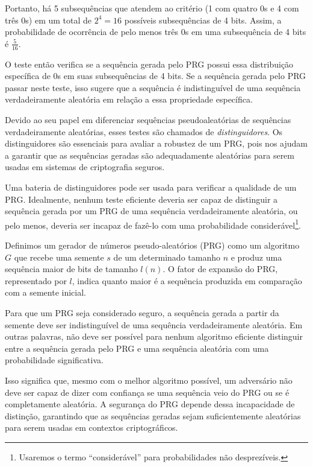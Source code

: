 Portanto, há 5 subsequências que atendem ao critério (1 com quatro $0$s e 4 com três $0$s) em um total de $2^4 = 16$ possíveis subsequências de 4 bits.
Assim, a probabilidade de ocorrência de pelo menos três $0$s em uma subsequência de 4 bits é $\frac{5}{16}$.

O teste então verifica se a sequência gerada pelo PRG possui essa distribuição específica de $0$s em suas subsequências de 4 bits.
Se a sequência gerada pelo PRG passar neste teste, isso sugere que a sequência é indistinguível de uma sequência verdadeiramente aleatória em relação a essa propriedade específica.

Devido ao seu papel em diferenciar sequências pseudoaleatórias de sequências verdadeiramente aleatórias, esses testes são chamados de {\em distinguidores}.
Os distinguidores são essenciais para avaliar a robustez de um PRG, pois nos ajudam a garantir que as sequências geradas são adequadamente aleatórias para serem usadas em sistemas de criptografia seguros.

Uma bateria de distinguidores pode ser usada para verificar a qualidade de um PRG.
Idealmente, nenhum teste eficiente deveria ser capaz de distinguir a sequência gerada por um PRG de uma sequência verdadeiramente aleatória, ou pelo menos, deveria ser incapaz de fazê-lo com uma probabilidade considerável\footnote{Usaremos o termo ``considerável'' para probabilidades não desprezíveis.}.

Definimos um gerador de números pseudo-aleatórios (PRG) como um algoritmo $G$ que recebe uma semente $s$ de um determinado tamanho $n$ e produz uma sequência maior de bits de tamanho $l(n)$.
O fator de expansão do PRG, representado por $l$, indica quanto maior é a sequência produzida em comparação com a semente inicial.

Para que um PRG seja considerado seguro, a sequência gerada a partir da semente deve ser indistinguível de uma sequência verdadeiramente aleatória.
Em outras palavras, não deve ser possível para nenhum algoritmo eficiente distinguir entre a sequência gerada pelo PRG e uma sequência aleatória com uma probabilidade significativa.

Isso significa que, mesmo com o melhor algoritmo possível, um adversário não deve ser capaz de dizer com confiança se uma sequência veio do PRG ou se é completamente aleatória.
A segurança do PRG depende dessa incapacidade de distinção, garantindo que as sequências geradas sejam suficientemente aleatórias para serem usadas em contextos criptográficos.

